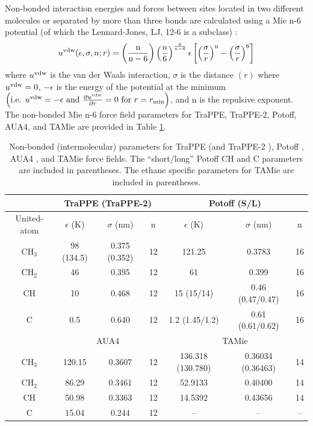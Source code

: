 \documentclass[preprint,review,12pt]{elsarticle}
\begin{document}
	Non-bonded interaction energies and forces between sites located in two different molecules or separated by more than three bonds are calculated using a Mie n-6 potential (of which the Lennard-Jones, LJ, 12-6 is a subclass) \cite{Herdes2015}:
	\begin{equation} \label{eq:Mie}
	u^{\rm vdw}(\epsilon,\sigma,n;r) = \left(\frac{\rm n}{\rm n - 6}\right)\left(\frac{n}{6}\right)^{\frac{6}{n - 6}} \epsilon \left[\left(\frac{\sigma}{r}\right)^{\rm n} - \left(\frac{\sigma}{r}\right)^6\right]
	\end{equation} 
	where $u^{\rm vdw}$ is the van der Waals interaction, $\sigma$ is the distance $(r)$ where $u^{\rm vdw} = 0$, $-\epsilon$ is the energy of the potential at the minimum $\left(\text{i.e. }u^{\rm vdw} = -\epsilon \text{ and } \frac{\partial u^{\rm vdw}}{\partial r} = 0 \text{ for } r=r_{\rm min} \right)$, and n is the repulsive exponent. The non-bonded Mie n-6 force field parameters for TraPPE, TraPPE-2, Potoff, AUA4, and TAMie are provided in Table \ref{tab:nonbonded params}. 
	
	\begin{table}[h!]
		\caption{Non-bonded (intermolecular) parameters for TraPPE \cite{TraPPE,Martin1999} (and TraPPE-2 \cite{TraPPEUA2}), Potoff \cite{Mie,Potoff_branched}, AUA4 \cite{AUA4,Nieto2008}, and TAMie \cite{TAMie,Weidler2016} force fields. The ``short/long'' Potoff CH and C parameters are included in parentheses. The ethane specific parameters for TAMie are included in parentheses.} \label{tab:nonbonded params}
		\begin{center}
			\begin{tabular}{|c|c|c|c|c|c|c|}
				\hline
				\multicolumn{1}{|c}{} & \multicolumn{3}{|c}{TraPPE  (TraPPE-2)} & \multicolumn{3}{|c|}{Potoff (S/L)}  \\ \hline
				United-atom & $\epsilon$ (K) & $\sigma$ (nm) & n & $\epsilon$ (K) & $\sigma$ (nm) & n \\ \hline
				CH$_3$ & 98 (134.5)  & 0.375 (0.352) & 12 & 121.25 & 0.3783 & 16  \\ 
				CH$_2$ & 46 & 0.395 & 12 & 61 & 0.399 & 16 \\ 
				CH & 10 & 0.468 & 12 & 15 (15/14) & 0.46 (0.47/0.47) & 16\\
				C & 0.5 & 0.640 & 12 & 1.2 (1.45/1.2) & 0.61 (0.61/0.62) & 16\\
				\hline
				\multicolumn{1}{|c}{} & \multicolumn{3}{|c}{AUA4} & \multicolumn{3}{|c|}{TAMie} \\ \hline
				CH$_3$ & 120.15  & 0.3607 & 12 & 136.318 (130.780) & 0.36034 (0.36463) & 14 \\ 
				CH$_2$ & 86.29 & 0.3461 & 12 & 52.9133 & 0.40400 & 14 \\ 
				CH & 50.98 & 0.3363 & 12 & 14.5392 & 0.43656 & 14\\
				C & 15.04 & 0.244 & 12 & -- & -- & --\\
				\hline
			\end{tabular}
		\end{center} 
	\end{table}
\end{document}
